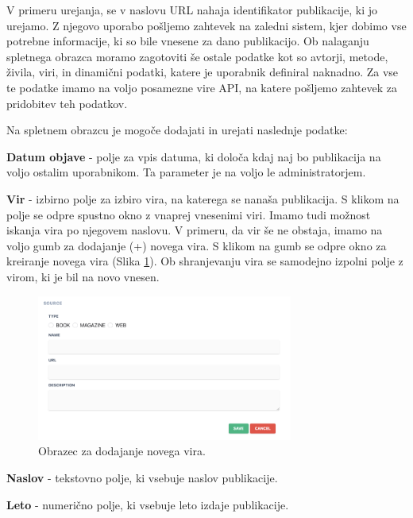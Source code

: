 V primeru urejanja, se v naslovu URL nahaja identifikator publikacije, ki jo urejamo. Z njegovo uporabo pošljemo zahtevek na zaledni sistem, kjer dobimo vse potrebne informacije, ki so bile vnesene za dano publikacijo. Ob nalaganju spletnega obrazca moramo zagotoviti še ostale podatke kot so avtorji, metode, živila, viri, in dinamični podatki, katere je uporabnik definiral naknadno. Za vse te podatke imamo na voljo posamezne vire API, na katere pošljemo zahtevek za pridobitev teh podatkov.

\clearpage
Na spletnem obrazcu je mogoče dodajati in urejati naslednje podatke:

\begin{description}
\item \textbf{Datum objave} - polje za vpis datuma, ki določa kdaj naj bo publikacija na voljo ostalim uporabnikom. Ta parameter je na voljo le administratorjem.

\item \textbf{Vir} - izbirno polje za izbiro vira, na katerega se nanaša publikacija. S klikom na polje se odpre spustno okno z vnaprej vnesenimi viri. Imamo tudi možnost iskanja vira po njegovem naslovu. V primeru, da vir še ne obstaja, imamo na voljo gumb za dodajanje (+) novega vira. S klikom na gumb se odpre okno za kreiranje novega vira (Slika \ref{add-source}). Ob shranjevanju vira se samodejno izpolni polje z virom, ki je bil na novo vnesen.

\begin{figure}[h]
\begin{center}
\includegraphics[width=0.75\textwidth]{slike/add-source.png}
\end{center}
\caption{ Obrazec za dodajanje novega vira. }
\label{add-source}
\end{figure}

\item \textbf{Naslov} - tekstovno polje, ki vsebuje naslov publikacije.

\item \textbf{Leto} - numerično polje, ki vsebuje leto izdaje publikacije.


\end{description}

